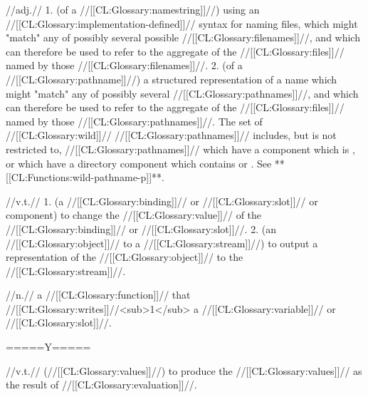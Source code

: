  //adj.// 1. (of a //[[CL:Glossary:namestring]]//) using an //[[CL:Glossary:implementation-defined]]// syntax for naming files, which might "match" any of possibly several possible //[[CL:Glossary:filenames]]//, and which can therefore be used to refer to the aggregate of the //[[CL:Glossary:files]]// named by those //[[CL:Glossary:filenames]]//. 2. (of a //[[CL:Glossary:pathname]]//) a structured representation of a name which might "match" any of possibly several //[[CL:Glossary:pathnames]]//, and which can therefore be used to refer to the aggregate of the //[[CL:Glossary:files]]// named by those //[[CL:Glossary:pathnames]]//. The set of //[[CL:Glossary:wild]]// //[[CL:Glossary:pathnames]]// includes, but is not restricted to, //[[CL:Glossary:pathnames]]// which have a component which is , or which have a directory component which contains  or . See **[[CL:Functions:wild-pathname-p]]**.

 //v.t.// 
 1. (a //[[CL:Glossary:binding]]// or //[[CL:Glossary:slot]]// or component) to change the //[[CL:Glossary:value]]// of the //[[CL:Glossary:binding]]// or //[[CL:Glossary:slot]]//. 2. (an //[[CL:Glossary:object]]// to a //[[CL:Glossary:stream]]//) to output a representation of the //[[CL:Glossary:object]]// to the //[[CL:Glossary:stream]]//.


 //n.// a //[[CL:Glossary:function]]// that //[[CL:Glossary:writes]]//<sub>1</sub> a //[[CL:Glossary:variable]]// or //[[CL:Glossary:slot]]//.

=====Y=====
 
 //v.t.// (//[[CL:Glossary:values]]//) to produce the //[[CL:Glossary:values]]// as the result of //[[CL:Glossary:evaluation]]//. 

\endlist
\endlist
